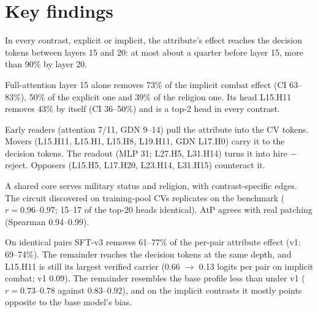\documentclass[11pt,a4paper]{article}
\newcommand{\head}[2]{\textsf{L#1.H#2}}
\begin{document}
\section{Key findings}

\begin{finding}
In every contrast, explicit or implicit, the attribute's effect reaches the decision tokens between
layers 15 and 20: at most about a quarter before layer 15, more than 90\% by layer 20.
\end{finding}
\begin{finding}
Full-attention layer 15 alone removes 73\% of the implicit combat effect (CI 63--83\%), 50\% of the
explicit one and 39\% of the religion one. Its head \head{15}{11} removes 43\% by itself (CI
36--50\%) and is a top-2 head in every contrast.
\end{finding}
\begin{finding}
Early readers (attention 7/11, GDN 9--14) pull the attribute into the CV tokens. Movers
(\head{15}{11}, \head{15}{1}, \head{15}{8}, \head{19}{11}, GDN \head{17}{0}) carry it to the
decision tokens. The readout (MLP 31; \head{27}{5}, \head{31}{14}) turns it into hire $-$ reject.
Opposers (\head{15}{5}, \head{17}{20}, \head{23}{14}, \head{31}{15}) counteract it.
\end{finding}
\begin{finding}
A shared core serves military status and religion, with contrast-specific edges. The circuit
discovered on training-pool CVs replicates on the benchmark ($r=0.96$--$0.97$; 15--17 of the
top-20 heads identical). AtP agrees with real patching (Spearman 0.94--0.99).
\end{finding}
\begin{finding}
On identical pairs SFT-v3 removes 61--77\% of the per-pair attribute effect (v1: 69--74\%). The
remainder reaches the decision tokens at the same depth, and \head{15}{11} is still its largest
verified carrier (0.66 $\to$ 0.13 logits per pair on implicit combat; v1 0.09). The remainder
resembles the base profile less than under v1 ($r=0.73$--$0.78$ against $0.83$--$0.92$), and on the
implicit contrasts it mostly points opposite to the base model's bias.
\end{finding}

\end{document}
